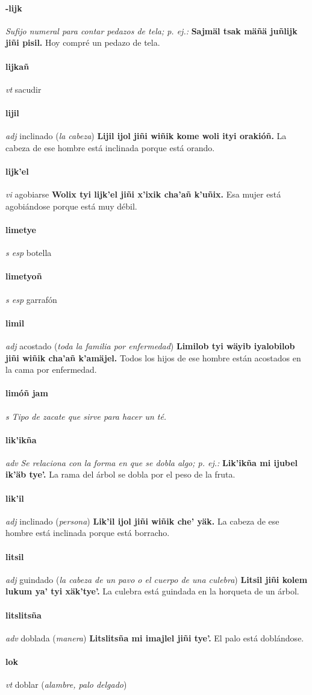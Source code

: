 \documentclass{scrbook}
\newcommand{\entry}[1]{\paragraph{#1}}
\newcommand{\nontranslationdef}[1]{\textit{#1}}
\newcommand{\partofspeech}[1]{\textit{#1}}
\newcommand{\spanishtranslation}[1]{#1}
\newcommand{\clarification}[1]{(\textit{#1})}
\newcommand{\cholexample}[1]{\textbf{#1}}
\newcommand{\exampletranslation}[1]{#1}
\begin{document}
\begin{multicols}{2}
\entry{-lijk}
\nontranslationdef{Sufijo numeral para contar pedazos de tela; p. ej.:}
\cholexample{Sajmäl tsak mäñä juñlijk jiñi pisil.}
\exampletranslation{Hoy compré un pedazo de tela.}

\entry{lijkañ}
\partofspeech{vt}
\spanishtranslation{sacudir}

\entry{lijil}
\partofspeech{adj}
\spanishtranslation{inclinado}
\clarification{la cabeza}
\cholexample{Lijil ijol jiñi wiñik kome woli ityi orakióñ.}
\exampletranslation{La cabeza de ese hombre está inclinada porque está orando.}

\entry{lijk'el}
\partofspeech{vi}
\spanishtranslation{agobiarse}
\cholexample{Wolix tyi lijk'el jiñi x'ixik cha'añ k'uñix.}
\exampletranslation{Esa mujer está agobiándose porque está muy débil.}

\entry{limetye}
\partofspeech{s esp}
\spanishtranslation{botella}

\entry{limetyoñ}
\partofspeech{s esp}
\spanishtranslation{garrafón}

\entry{limil}
\partofspeech{adj}
\spanishtranslation{acostado}
\clarification{toda la familia por enfermedad}
\cholexample{Limilob tyi wäyib iyalobilob jiñi wiñik cha'añ k'amäjel.}
\exampletranslation{Todos los hijos de ese hombre están acostados en la cama por enfermedad.}

\entry{limóñ jam}
\partofspeech{s}
\nontranslationdef{Tipo de zacate que sirve para hacer un té.}

\entry{lik'ikña}
\partofspeech{adv}
\nontranslationdef{Se relaciona con la forma en que se dobla algo; p. ej.:}
\cholexample{Lik'ikña mi ijubel ik'äb tye'.}
\exampletranslation{La rama del árbol se dobla por el peso de la fruta.}

\entry{lik'il}
\partofspeech{adj}
\spanishtranslation{inclinado}
\clarification{persona}
\cholexample{Lik'il ijol jiñi wiñik che' yäk.}
\exampletranslation{La cabeza de ese hombre está inclinada porque está borracho.}

\entry{litsil}
\partofspeech{adj}
\spanishtranslation{guindado}
\clarification{la cabeza de un pavo o el cuerpo de una culebra}
\cholexample{Litsil jiñi kolem lukum ya' tyi xäk'tye'.}
\exampletranslation{La culebra está guindada en la horqueta de un árbol.}

\entry{litslitsña}
\partofspeech{adv}
\spanishtranslation{doblada}
\clarification{manera}
\cholexample{Litslitsña mi imajlel jiñi tye'.}
\exampletranslation{El palo está doblándose.}

\entry{lok}
\partofspeech{vt}
\spanishtranslation{doblar}
\clarification{alambre, palo delgado}


\end{multicols}
\end{document}
